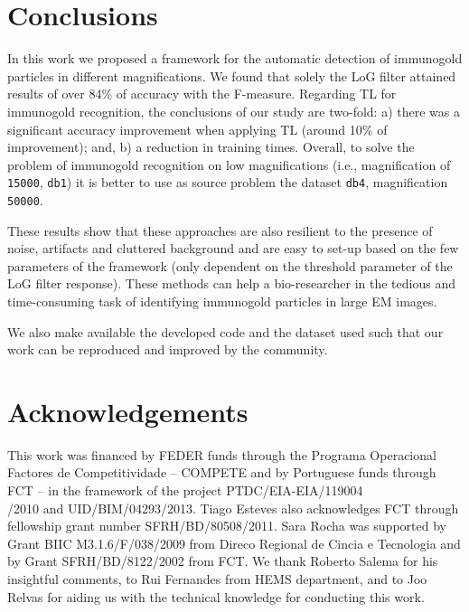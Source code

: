\documentclass[a4paper,11pt]{article}
\newcommand{\1}{\mathbbm{1}}
\newcommand{\db}[1]{\texttt{#1}}
\theoremstyle{plain}
\begin{document}
\section{Conclusions}
\label{sec:conclusions}

In this work we proposed a framework for the automatic detection of immunogold particles in different magnifications. We found that solely the \ac{LoG} filter attained results of over 84\% of accuracy with the F-measure.
Regarding \ac{TL} for immunogold recognition, the conclusions of our study are two-fold: a) there was a significant accuracy improvement when applying \ac{TL} (around 10\% of improvement); and, b) a reduction in training times. Overall, to solve the problem of immunogold recognition on low magnifications (i.e., magnification of \db{15000}, \db{db1}) it is better to use as source problem the dataset \db{db4}, magnification \db{50000}.

These results show that these approaches are also resilient to the presence of noise, artifacts and cluttered background and are easy to set-up based on the few parameters of the framework (only dependent on the threshold parameter of the \ac{LoG} filter response).
These methods can help a bio-researcher in the tedious and time-consuming task of identifying immunogold particles in large EM images.

We also make available the developed code and the dataset used such that our work can be reproduced and improved by the community.


\section{Acknowledgements}
This work was financed by FEDER funds through the Programa Operacional Factores de Competitividade – COMPETE and by Portuguese funds through FCT – in the framework of the project PTDC/EIA-EIA/119004\\/2010 and UID/BIM/04293/2013.
Tiago Esteves also acknowledges FCT through fellowship grant number SFRH/BD/80508/2011.
Sara Rocha was supported by Grant BIIC M3.1.6/F/038/2009 from Direco Regional de Cincia e Tecnologia and by Grant SFRH/BD/8122/2002 from FCT.
We thank Roberto Salema for his insightful comments, to Rui Fernandes from HEMS department, and to Joo Relvas for aiding us with the technical knowledge for conducting this work.
\end{document}
